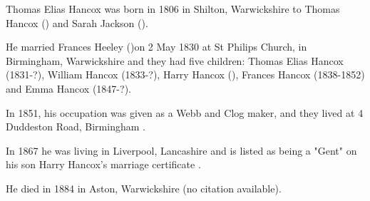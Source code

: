 
Thomas Elias Hancox was born in 1806 in Shilton, Warwickshire \cite{TEHancoxBirth} to Thomas Hancox () and Sarah Jackson ().

He married Frances Heeley ()on 2  May 1830 	at St Philips Church, in Birmingham, Warwickshire and they had five children: Thomas Elias Hancox (1831-?), William Hancox (1833-?), Harry Hancox (), Frances Hancox (1838-1852) and Emma Hancox (1847-?).

In 1851, his occupation was given as a Webb and Clog maker, and they lived at 4 Duddeston Road, Birmingham \cite{TEHancoxOccupation}.

In 1867 he was living in Liverpool, Lancashire and is listed as being a "Gent" on his son Harry Hancox's marriage certificate \cite{TEHancox1867}.

He died in 1884 in Aston, Warwickshire (no citation available).
